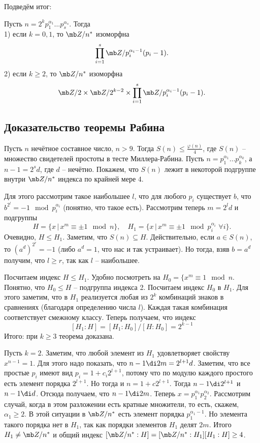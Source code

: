 \endproof

Подведём итог: 

 Пусть $n=2^kp_1^{\alpha_1}\dots p_s^{\alpha_s}$. Тогда\\
1) если $k = 0,1$, то  $\mb Z/n^*$ изоморфна $$\prod_{i=1}^s \mb Z/p_i^{\alpha_i-1}(p_i -1).$$
2) если $ k\geq 2$, то $\mb Z/n^*$ изоморфна $$\mb Z/2 \times \mb Z/2^{k-2} \times \prod_{i=1}^s \mb Z/p_i^{\alpha_i-1}(p_i -1).$$
\ecrl

\subsection{Доказательство теоремы Рабина}

\thrm[Рабин] Пусть $n$ нечётное составное число,  $n>9$. Тогда $S(n)\leq \frac{\varphi(n)}{4}$, где $S(n)$ -- множество свидетелей простоты в тесте Миллера-Рабина.
\ethrm
\proof Пусть $n=p_1^{\alpha_1}\dots p_k^{\alpha_k}$, а $n-1=2^sd$, где $d$ -- нечётно. Покажем, что $S(n)$ лежит в некоторой подгруппе внутри $\mb Z/n^*$ индекса по крайней мере $4$.

Для этого рассмотрим  такое наибольшее $l$, что для любого $p_i$ существует $b$, что $b^{2^l}=-1 \mod p_i^{\alpha_i}$ (понятно, что такое есть). Рассмотрим теперь $m=2^ld$ и подгруппы
$$H=\{ x\,|\, x^m\equiv \pm 1 \mod n\}, \quad
H_1=\{ x\,|\, x^m \equiv \pm 1 \mod p_i^{\alpha_i} \,\,\forall i\}.$$
Очевидно, $H \leq H_1$. Заметим, что $S(n) \subseteq H$. Действительно, если $a\in S(n)$, то $(a^d)^{2^r}= -1$ (либо $a^d=1$, что нас и так устраивает).  Но тогда, взяв $b=a^d$ получим, что $l\geq r$, так как $l$ -- наибольшее.

Посчитаем индекс $H \leq H_1$. Удобно посмотреть на $H_0= \{ x^m \equiv 1 \mod n$. Понятно, что $H_0 \leq H$ -- подгруппа индекса 2. Посчитаем индекс $H_0$ в $H_1$. Для этого заметим, что в $H_1$ реализуется любая из $2^k$ комбинаций знаков в сравнениях (благодаря определению числа $l$). Каждая такая комбинация соответствует смежному классу. Теперь получаем, что индекс $$[H_1:H]=[H_1:H_0]/[H:H_0]=2^{k-1}$$
Итого: при $k\geq 3$ теорема доказана.


Пусть $k=2$. Заметим, что любой элемент из $H_1$ удовлетворяет свойству $x^{n-1}=1$. Для этого надо показать, что $n-1 \di 2m=2^{l+1}d$. Заметим, что все простые $p_i$ имеют вид $p_i=1+c_i2^{l+1}$, потому что по модулю каждого простого есть элемент порядка $2^{l+1}$. Но тогда и $n=1+c2^{l+1}$. Тогда $n-1\di 2^{l+1}$ и $n-1\di d$. Отсюда получаем, что $n-1 \di 2m$. Теперь  $x=p_1^{\alpha_1}p_2^{\alpha_2}$. Рассмотрим случай, когда в этом разложении есть кратные множители, то есть, скажем, $\alpha_1\geq 2$. В этой ситуации в $\mb Z/n^*$ есть элемент порядка $p_1^{\alpha_1-1}$. Но элемента такого порядка нет в $H_1$, так как порядки элементов $H_1$ делят $2m$. Итого $H_1 \neq \mb Z/n^*$ и общий индекс $[\mb Z/n^*: H]=[\mb Z/n^*:H_1][H_1:H]\geq 4$.

